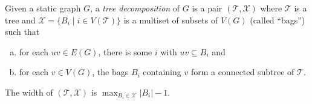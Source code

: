 \begin{definition}\label{def:TD}
  Given a static graph $G$, a \emph{tree decomposition} of $G$ is a pair $(\mathcal{T},\mathcal{X})$
  where $\mathcal{T}$ is a tree and 
  $\mathcal{X}=\{B_i\mid i\in V(\mathcal{T})\}$ is a multiset of subsets of $V(G)$ (called ``bags'') such that
  \begin{enumerate}[(a)]
    \item for each $uv \in E(G)$, there is some $i$ with $uv \subseteq B_i$ and
    \item for each $v \in V(G)$, the bags $B_i$ containing $v$ form a connected subtree of $\mathcal{T}$.
    \end{enumerate}
    \vspace{0.1cm}
  The width of $(\mathcal{T},\mathcal{X})$ is $\max_{B_i \in \mathcal{X}} |B_i|-1$.
% 
\end{definition}

